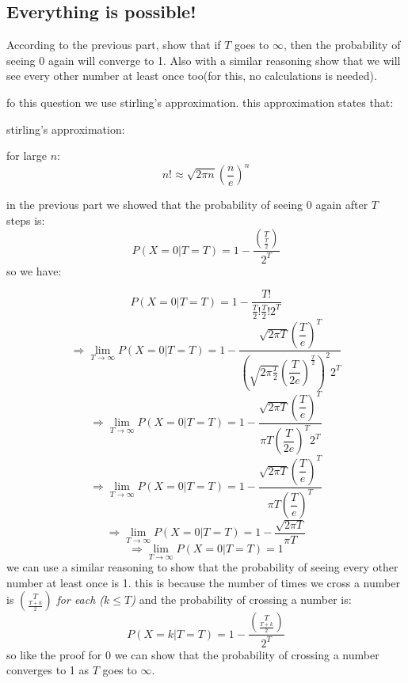 \subsection{ Everything is possible!}
According to the previous part, show that if $T$ goes to $\infty$, then the probability of seeing 0 again
will converge to 1. Also with a similar reasoning show that we will see every other number at
least once too(for this, no calculations is needed).
\begin{qsolve}
	fo this question we use stirling's approximation. this approximation states that:
	\begin{qsolve}[]
		\begin{center}
			stirling's approximation: 
		\end{center}
		for large $n$:
		$$n! \approx \sqrt{2\pi n}\left(\dfrac{n}{e}\right)^n$$
	\end{qsolve}
	in the previous part we showed that the probability of seeing 0 again after $T$ steps is:
	$$P(X=0|T=T) = 1 - \dfrac{\binom{T}{ \frac{T}{2} }}{2^T}$$
	so we have:
	\begin{qsolve}[]
		$$P(X=0|T=T) = 1 - \dfrac{T!}{\frac{T}{2}!\frac{T}{2}! 2^T}$$
		$$\Rightarrow \lim_{T \to \infty} P(X=0|T=T) = 1 - \dfrac{\sqrt{2\pi T}\left(\dfrac{T}{e}\right)^T}{(\sqrt{2\pi \frac{T}{2}}\left(\dfrac{T}{2e}\right)^{\frac{T}{2}})^2 2^T }$$
		$$\Rightarrow \lim_{T \to \infty} P(X=0|T=T) = 1 - \dfrac{\sqrt{2\pi T}\left(\dfrac{T}{e}\right)^T}{\pi T \left(\dfrac{T}{2e}\right)^T 2^T}$$
		$$\Rightarrow \lim_{T \to \infty} P(X=0|T=T) = 1 - \dfrac{\sqrt{2\pi T}\left(\dfrac{T}{e}\right)^T}{\pi T \left(\dfrac{T}{e}\right)^T}$$
		$$\Rightarrow \lim_{T \to \infty} P(X=0|T=T) = 1 - \dfrac{\sqrt{2\pi T}}{\pi T}$$
		$$\Rightarrow \lim_{T \to \infty} P(X=0|T=T) = 1$$
		we can use a similar reasoning to show that the probability of seeing every other number at least once is 1.
		this is because the number of times we cross a number is $\binom{T}{\frac{T+k}{2}}$ \textit{for each ($k \leq T$)} and the probability of crossing a number is:
		\splitqsolve[\splitqsolve]
		$$P(X=k|T=T) = 1 - \dfrac{\binom{T}{ \frac{T+k}{2} }}{2^T}$$
		so like the proof for 0 we can show that the probability of crossing a number converges to 1 as $T$ goes to $\infty$.
	\end{qsolve}


\end{qsolve}

